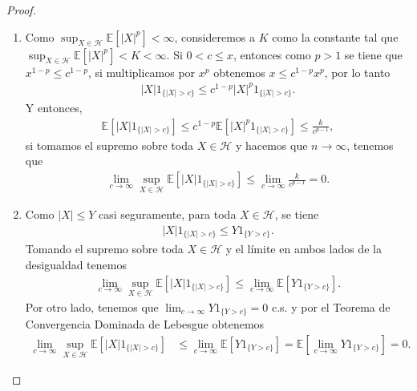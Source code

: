 \begin{proof}
	\begin{enumerate}
	\item Como $\sup_{X \in \mathcal{H}} \mathbb{E}[|X|^p] < \infty$, consideremos a $K$ como la constante tal que $\sup_{X \in \mathcal{H}} \mathbb{E}[|X|^p] < K < \infty$. Si $0 < c \leq x$, entonces como $p > 1$ se tiene que $x^{1-p} \leq c^{1-p}$, si multiplicamos por $x^p$ obtenemos $x \leq c^{1-p}x^p$, por lo tanto
		\begin{align*}
		|X| 1_{\{|X| > c\}} \leq c^{1-p}  |X|^p 1_{\{|X| > c\}}.
		\end{align*}
	Y entonces,
		\begin{align*}
		\mathbb{E}\left[ |X| 1_{\{|X| > c\}} \right] \leq c^{1-p}  \mathbb{E} \left[ |X|^p 1_{\{|X| > c\}} \right] \leq \frac{k}{c^{p-1}},
		\end{align*}
	si tomamos el supremo sobre toda $X \in \mathcal{H}$ y hacemos que $n \rightarrow \infty$, tenemos que
		\begin{align*}
		\lim_{c \rightarrow \infty} \sup_{X \in \mathcal{H}} \mathbb{E} \left[ |X| 1_{ \{|X| > c\} } \right] \leq \lim_{c \rightarrow \infty} \frac{k}{c^{p-1}} = 0.
		\end{align*}
		
	\item Como $|X| \leq Y$ casi seguramente, para toda $X \in \mathcal{H}$, se tiene
		\begin{align*}
		|X| 1_{ \{|X| > c\} } \leq Y 1_{ \{Y > c\} }.
		\end{align*}
	Tomando el supremo sobre toda $X \in \mathcal{H}$ y el límite en ambos lados de la desigualdad tenemos
		\begin{align*}
		\lim_{c \rightarrow \infty} \sup_{X \in \mathcal{H}} \mathbb{E} \left[ |X| 1_{ \{|X| > c\} } \right] \leq \lim_{c \rightarrow \infty} \mathbb{E}\left[Y 1_{ \{Y > c\} }\right].
		\end{align*}
	Por otro lado, tenemos que $\lim_{c \rightarrow \infty} Y 1_{ \{Y > c\} } = 0$ c.s. y por el Teorema de Convergencia Dominada de Lebesgue obtenemos
		\begin{align*}
		\lim_{c \rightarrow \infty} \sup_{X \in \mathcal{H}} \mathbb{E} \left[ |X| 1_{ \{|X| > c\} } \right] & \leq \lim_{c \rightarrow \infty} \mathbb{E} \left[ Y 1_{ \{Y > c\} } \right] = \mathbb{E} \left[ \lim_{c \rightarrow \infty} Y 1_{ \{Y > c\} } \right] = 0.
		\end{align*}
	\end{enumerate}
\end{proof}

